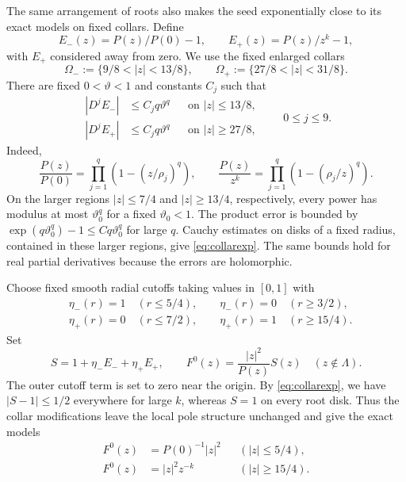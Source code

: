 \documentclass[11pt,a4paper,leqno]{amsart}
\numberwithin{equation}{section}
\theoremstyle{landisplain}
\theoremstyle{landisdefinition}
\theoremstyle{landisremark}
\begin{document}
The same arrangement of roots also makes the seed exponentially
close to its exact models on fixed collars. Define
\[
 E_-(z)=P(z)/P(0)-1,\qquad E_+(z)=P(z)/z^k-1,
\]
with $E_+$ considered away from zero. We use the fixed enlarged
collars
\begin{equation}\label{eq:collar-domains}
 \Omega_-:=\{9/8<|z|<13/8\},\qquad
 \Omega_+:=\{27/8<|z|<31/8\}.
\end{equation}
There are fixed $0<\vartheta<1$ and constants $C_j$ such that
\begin{equation}\label{eq:collarexp}
 \begin{aligned}
 |D^jE_-|&\le C_jq\vartheta^q&&\text{on }|z|\le13/8,\\
 |D^jE_+|&\le C_jq\vartheta^q&&\text{on }|z|\ge27/8,
 \end{aligned}
 \qquad 0\le j\le9.
\end{equation}
Indeed,
\begin{equation}\label{eq:collar-products}
 \frac{P(z)}{P(0)}=\prod_{j=1}^q\left(1-(z/\rho_j)^q\right),\qquad
 \frac{P(z)}{z^k}=\prod_{j=1}^q\left(1-(\rho_j/z)^q\right).
\end{equation}
On the larger regions $|z|\le7/4$ and $|z|\ge13/4$, respectively,
every power has modulus at most $\vartheta_0^q$ for a fixed
$\vartheta_0<1$. The product error is bounded by
$\exp(q\vartheta_0^q)-1\le Cq\vartheta_0^q$ for large $q$.
Cauchy estimates on disks of a fixed radius, contained in these larger
regions, give \eqref{eq:collarexp}. The same bounds hold for real
partial derivatives because the errors are holomorphic.

Choose fixed smooth radial cutoffs taking values in $[0,1]$ with
\begin{align*}
 &\eta_-(r)=1\quad(r\le5/4),\qquad
 \eta_-(r)=0\quad(r\ge3/2),\\
 &\eta_+(r)=0\quad(r\le7/2),\qquad
 \eta_+(r)=1\quad(r\ge15/4).
\end{align*}
Set
\begin{equation}\label{eq:seed}
 S=1+\eta_-E_-+\eta_+E_+,\qquad
 F^0(z)=\frac{|z|^2}{P(z)}S(z)\quad(z\notin\Lambda).
\end{equation}
The outer cutoff term is set to zero near the origin. By
\eqref{eq:collarexp}, we have $|S-1|\le1/2$ everywhere for
large $k$, whereas $S=1$ on every root disk. Thus the collar
modifications leave the local pole structure unchanged and give
the exact models
\begin{equation}\label{eq:models}
 \begin{aligned}
 F^0(z)&=P(0)^{-1}|z|^2&&(|z|\le5/4),\\
 F^0(z)&=|z|^2z^{-k}&&(|z|\ge15/4).
 \end{aligned}
\end{equation}
\end{document}
